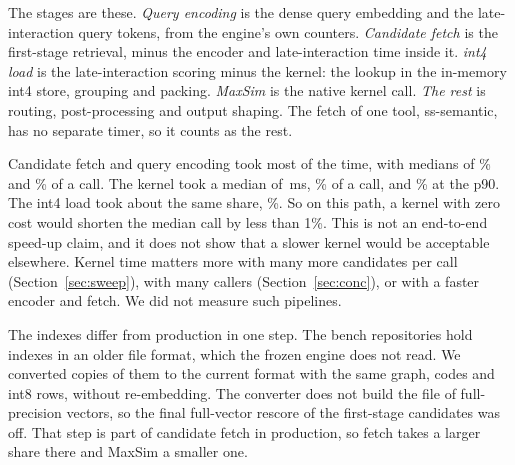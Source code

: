 The stages are these.
\emph{Query encoding} is the dense query embedding and the late-interaction query tokens, from the engine's own counters.
\emph{Candidate fetch} is the first-stage retrieval, minus the encoder and late-interaction time inside it.
\emph{int4 load} is the late-interaction scoring minus the kernel: the lookup in the in-memory int4 store, grouping and packing.
\emph{MaxSim} is the native kernel call.
\emph{The rest} is routing, post-processing and output shaping.
The fetch of one tool, ss-semantic, has no separate timer, so it counts as the rest.

Candidate fetch and query encoding took most of the time, with medians of \% and \% of a call.
The kernel took a median of \,ms, \% of a call, and \% at the p90.
The int4 load took about the same share, \%.
So on this path, a kernel with zero cost would shorten the median call by less than 1\%.
This is not an end-to-end speed-up claim, and it does not show that a slower kernel would be acceptable elsewhere.
Kernel time matters more with many more candidates per call (Section~\ref{sec:sweep}), with many callers (Section~\ref{sec:conc}), or with a faster encoder and fetch.
We did not measure such pipelines.

The indexes differ from production in one step.
The bench repositories hold indexes in an older file format, which the frozen engine does not read.
We converted copies of them to the current format with the same graph, codes and int8 rows, without re-embedding.
The converter does not build the file of full-precision vectors, so the final full-vector rescore of the first-stage candidates was off.
That step is part of candidate fetch in production, so fetch takes a larger share there and MaxSim a smaller one.
